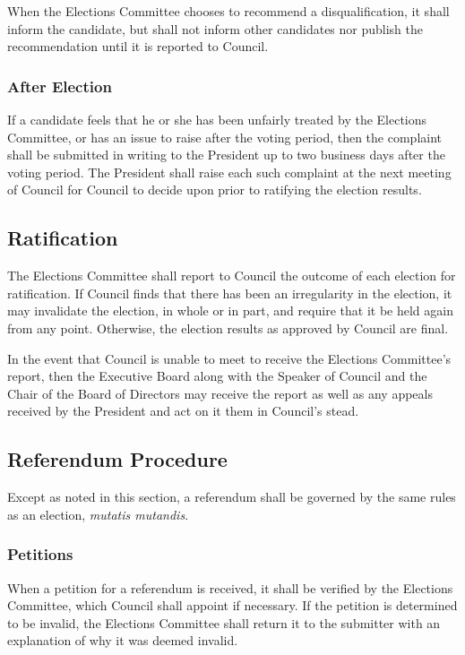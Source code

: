 When the Elections Committee chooses to recommend a disqualification, it shall inform the candidate, but shall not inform other candidates nor publish the recommendation until it is reported to Council.

\subsubsection{After Election}
If a candidate feels that he or she has been unfairly treated by the Elections Committee, or has an issue to raise after the voting period, then the complaint shall be submitted in writing to the President up to two business days after the voting period.
The President shall raise each such complaint at the next meeting of Council for Council to decide upon prior to ratifying the election results.

\subsection{Ratification}
The Elections Committee shall report to Council the outcome of each election for ratification.
If Council finds that there has been an irregularity in the election, it may invalidate the election, in whole or in part, and require that it be held again from any point.
Otherwise, the election results as approved by Council are final.

In the event that Council is unable to meet to receive the Elections Committee's report, then the Executive Board along with the Speaker of Council and the Chair of the Board of Directors  may receive the report as well as any appeals received by the President and act on it them in Council's stead.

\subsection{Referendum Procedure}
Except as noted in this section, a referendum shall be governed by the same rules as an election, \emph{mutatis mutandis}.

\subsubsection{Petitions}
When a petition for a referendum is received, it shall be verified by the Elections Committee, which Council shall appoint if necessary.
If the petition is determined to be invalid, the Elections Committee shall return it to the submitter with an explanation of why it was deemed invalid.

